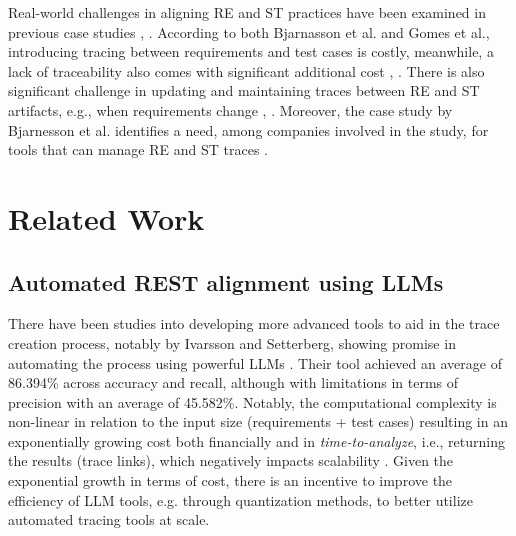\documentclass[conference]{IEEEtran}
\begin{document}
Real-world challenges in aligning RE and ST practices have been examined in previous case studies \cite{bjarnasonChallengesPracticesAligning2014}, \cite{gomesdeoliveiranetoChallengesAligningRequirements2017}. According to both Bjarnasson et al. and Gomes et al., introducing tracing between requirements and test cases is costly, meanwhile, a lack of traceability also comes with significant additional cost \cite{bjarnasonChallengesPracticesAligning2014}, \cite{gomesdeoliveiranetoChallengesAligningRequirements2017}. There is also significant challenge in updating and maintaining traces between RE and ST artifacts, e.g., when requirements change \cite{bjarnasonChallengesPracticesAligning2014}, \cite{gomesdeoliveiranetoChallengesAligningRequirements2017}. Moreover, the case study by Bjarnesson et al. identifies a need, among companies involved in the study, for tools that can manage RE and ST traces \cite{bjarnasonChallengesPracticesAligning2014}.

\section{Related Work}\label{relatedWork}

\subsection{Automated REST alignment using LLMs}

There have been studies into developing more advanced tools to aid in the trace creation process, notably by Ivarsson and Setterberg, showing promise in automating the process using powerful LLMs \cite{ivarsson2023automated}. Their tool achieved an average of 86.394\% across accuracy and recall, although with limitations in terms of precision with an average of 45.582\%. Notably, the computational complexity is non-linear in relation to the input size (requirements + test cases) resulting in an exponentially growing cost both financially and in \textit{time-to-analyze}, i.e., returning the results (trace links), which negatively impacts scalability \cite{ivarsson2023automated}. Given the exponential growth in terms of cost, there is an incentive to improve the efficiency of LLM tools, e.g. through quantization methods, to better utilize automated tracing tools at scale.
\end{document}
